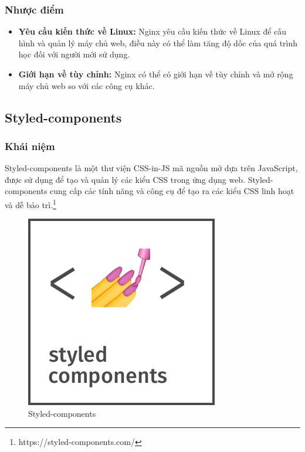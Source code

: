 \subsubsection{Nhược điểm}
\begin{itemize}
  \item \textbf{Yêu cầu kiến thức về Linux:} Nginx yêu cầu kiến thức về Linux để cấu hình và quản lý máy chủ web, điều này có thể làm tăng độ dốc của quá trình học đối với người mới sử dụng.
  \item \textbf{Giới hạn về tùy chỉnh:} Nginx có thể có giới hạn về tùy chỉnh và mở rộng máy chủ web so với các công cụ khác.
\end{itemize}
\subsection{Styled-components}
\subsubsection{Khái niệm}
\noindent Styled-components là một thư viện CSS-in-JS mã nguồn mở dựa trên JavaScript, được sử dụng để tạo và quản lý các kiểu CSS trong ứng dụng web. Styled-components cung cấp các tính năng và công cụ để tạo ra các kiểu CSS linh hoạt và dễ bảo trì.\footnote{https://styled-components.com/}
\begin{figure}[H]
  \begin{center}
    \includegraphics[scale=0.35]{images/hieu/phuluc/styled-components.png}
    \caption{Styled-components}
  \end{center}
\end{figure}
